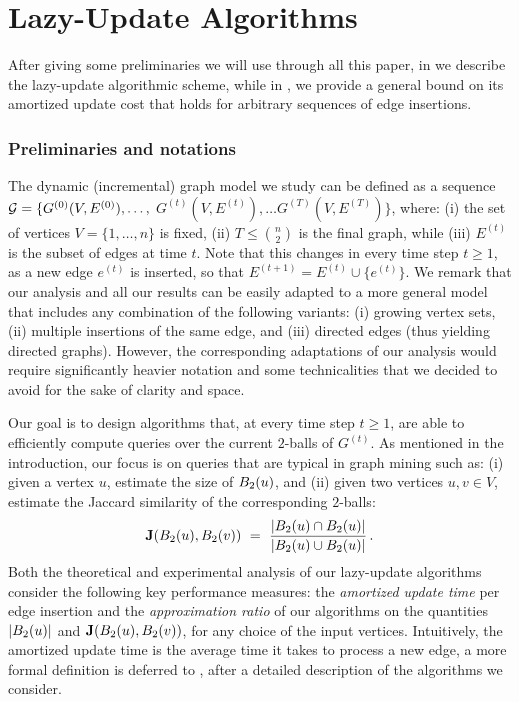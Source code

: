 \section{Lazy-Update Algorithms} \label{sec:detalgo}


After giving some preliminaries we will use through all this paper, in  we describe the lazy-update algorithmic scheme, while in , we provide a general bound on its amortized update cost that holds for  arbitrary sequences of edge insertions.

\subsubsection*{Preliminaries and notations}
The dynamic (incremental) graph model we study can be defined as a sequence
    ${\mathcal G} = \{ G^{(0)}(V,E^{(0)}), \ldots, $ $ G^{(t)}(V,E^{(t)}),  \ldots G^{(T)}(V,E^{(T)}) \}$,   where: (i) the set of vertices $V = \{1, \ldots , n \}$ is fixed, (ii) $T \leq \binom{n}{2}$ is the final graph,  while (iii)  $E^{(t)}$ is the subset of edges at time $t$. Note that this  changes in every time step $t \geq 1$, as a new edge $e^{(t)}$ is inserted, so that $E^{(t+1)} = E^{(t)} \cup \{e^{(t)}\} $. 
We remark that  our analysis and all our results can be easily adapted to a more general model that includes any combination of the following variants: (i)  growing vertex sets, (ii)  multiple insertions of the same edge, and (iii) directed edges (thus yielding directed graphs).  However,  the corresponding  adaptations of our analysis  would require  significantly heavier notation and some technicalities that  we decided to avoid for the sake of clarity and space.

Our goal is to design algorithms that, at every time step $t \geq 1$, are able to efficiently compute queries over the current $2$-balls of $G^{(t)}$. As mentioned in the introduction, our focus is on queries that are typical in graph mining such as: (i) given a vertex $u$, estimate the size of $B_2(u)$, and (ii) given two vertices $u,v \in V$, estimate the Jaccard similarity of the corresponding $2$-balls:
\[ 
    \jacc(\ball_2(u),\ball_2(v)) \ = \ \frac{|\ball_2(u) \cap \ball_2(u) |}{|\ball_2(u) \cup \ball_2(u) |}  \, . 
\]
Both the  theoretical  and experimental analysis of  our   lazy-update algorithms  consider the following key performance  measures: the \textit{amortized update time} per edge insertion and the \textit{approximation ratio} of our algorithms on the quantities $|B_2(u)|$ and $\mathbf J(B_2(u),B_2(v))$, for any choice of the input vertices. Intuitively, the amortized update time is the average time it takes to process a new edge, a more formal definition is deferred to , after  a detailed description of the   algorithms  we consider.
    
